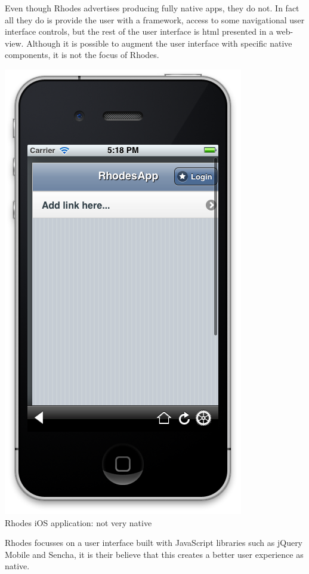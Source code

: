 Even though Rhodes advertises producing fully native apps\cite{RhoMobile}, they do not. In fact all they do is provide the user with a framework, access to some navigational user interface controls, but the rest of the user interface is html presented in a web-view. Although it is possible to augment the user interface with specific native components, it is not the focus of Rhodes.\\
\begin{centering}
	\includegraphics[scale=0.3]{images/rhodes_notsonative.png}\\{Rhodes iOS application: not very native}\\
\end{centering}

Rhodes focusses on a user interface built with JavaScript libraries such as jQuery Mobile and Sencha, it is their believe that this creates a better user experience as native.\cite{Blum2011}

